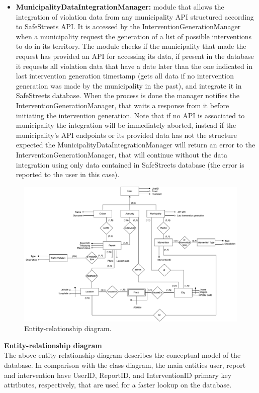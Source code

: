 \begin{itemize}
	\item \textbf{MunicipalityDataIntegrationManager:}
	module that allows the integration of violation data from any municipality API structured according to SafeStreets API. It is accessed by the InterventionGenerationManager when a municipality request the generation of a list of possible interventions to do in its territory. The module checks if the municipality that made the request has provided an API for accessing its data, if present in the database it requests all violation data that have a date later than the one indicated in last intervention generation timestamp (gets all data if no intervention generation was made by the municipality in the past), and integrate it in SafeStreets database. When the process is done the manager notifies the InterventionGenerationManager, that waits a response from it before initiating the intervention generation. Note that if no API is associated to municipality the integration will be immediately aborted, instead if the municipality's API endpoints or its provided data has not the structure expected the MunicipalityDataIntegrationManager will return an error to the InterventionGenerationManager, that will continue without the data integration using only data contained in SafeStreets database (the error is reported to the user in this case).
\end{itemize}


\begin{figure}[H]
	\centering
	\includegraphics[width=\linewidth]{Images/ER_diagram.png}
	\caption{Entity-relationship diagram.}
\end{figure}
\textbf{Entity-relationship diagram}\\
The above entity-relationship diagram describes the conceptual model of the database. In comparison with the class diagram, the main entities user, report and intervention have UserID, ReportID, and InterventionID primary key attributes, respectively, that are used for a faster lookup on the database.

